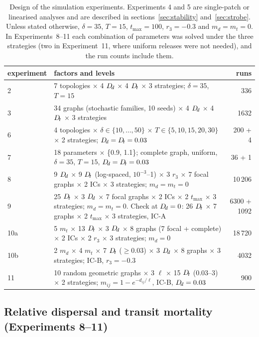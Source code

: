 \begin{table}[t]
\centering
\caption{Design of the simulation experiments. Experiments 4 and 5 are single-patch or linearised analyses and are described in sections~\ref{sec:stability} and~\ref{sec:strobe}. Unless stated otherwise, $\delta=35$, $T=15$, $t_{\max}=100$, $r_3=-0.3$ and $m_d=m_t=0$. In Experiments~8--11 each combination of parameters was solved under the three strategies (two in Experiment~11, where uniform releases were not needed), and the run counts include them.}
\label{tab:experiments}
\small
\begin{tabular}{p{1.9cm}p{10.2cm}r}
\toprule
experiment & factors and levels & runs\\
\midrule
2 & 7 topologies $\times$ 4 $D_{\!d}$ $\times$ 4 $D_{\!t}$ $\times$ 3 strategies; $\delta=35$, $T=15$ & 336\\
3 & 34 graphs (stochastic families, 10 seeds) $\times$ 4 $D_{\!d}$ $\times$ 4 $D_{\!t}$ $\times$ 3 strategies & 1632\\
6 & 4 topologies $\times$ $\delta\in\{10,\dots,50\}$ $\times$ $T\in\{5,10,15,20,30\}$ $\times$ 2 strategies; $D_{\!d}=D_{\!t}=0.03$ & 200 + 4\\
7 & 18 parameters $\times$ \{0.9, 1.1\}; complete graph, uniform, $\delta=35$, $T=15$, $D_{\!d}=D_{\!t}=0.03$ & 36 + 1\\
8 & 9 $D_{\!d}$ $\times$ 9 $D_{\!t}$ (log-spaced, $10^{-3}$--1) $\times$ 3 $r_3$ $\times$ 7 focal graphs $\times$ 2 ICs $\times$ 3 strategies; $m_d=m_t=0$ & 10\,206\\
9 & 25 $D_{\!t}$ $\times$ 3 $D_{\!d}$ $\times$ 7 focal graphs $\times$ 2 ICs $\times$ 2 $t_{\max}$ $\times$ 3 strategies; $m_d=m_t=0$. Check at $D_{\!d}=0$: 26 $D_{\!t}$ $\times$ 7 graphs $\times$ 2 $t_{\max}$ $\times$ 3 strategies, IC-A & 6300 + 1092\\
10a & 5 $m_t$ $\times$ 13 $D_{\!t}$ $\times$ 3 $D_{\!d}$ $\times$ 8 graphs (7 focal + complete) $\times$ 2 ICs $\times$ 2 $r_3$ $\times$ 3 strategies; $m_d=0$ & 18\,720\\
10b & 2 $m_d$ $\times$ 4 $m_t$ $\times$ 7 $D_{\!t}$ ($\geq 0.03$) $\times$ 3 $D_{\!d}$ $\times$ 8 graphs $\times$ 3 strategies; IC-B, $r_3=-0.3$ & 4032\\
11 & 10 random geometric graphs $\times$ 3 $\ell$ $\times$ 15 $D_{\!t}$ (0.03--3) $\times$ 2 strategies; $m_{ij}=1-e^{-d_{ij}/\ell}$, IC-B, $D_{\!d}=0.03$ & 900\\
\bottomrule
\end{tabular}
\end{table}

\subsection{Relative dispersal and transit mortality (Experiments 8--11)}
\label{sec:exp-transit}

